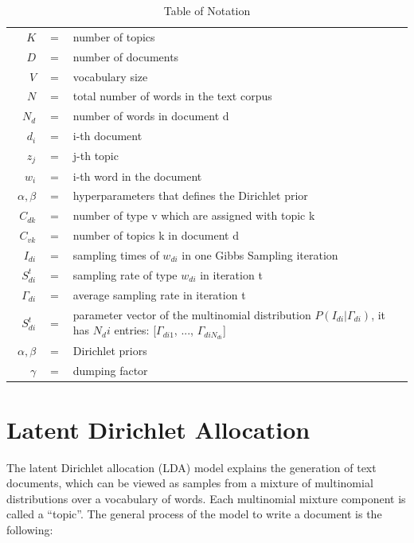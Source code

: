 \documentclass{article} %
\begin{document}
\begin{table}[htbp]\caption{Table of Notation}
\centering %
\begin{tabular}{r c p{10cm} }
\toprule

$K$ & $=$ & number of topics\\
$D$ & $=$ & number of documents\\
$V$ & $=$ & vocabulary size\\
$N$ & $=$ &  total number of words in the text corpus\\
$N_d$ & $=$ &  number of words in document d\\
$d_i$ & $=$ & i-th document\\
$z_j$ & $=$ & j-th topic\\
$w_i$ & $=$ & i-th word in the document\\
$\alpha, \beta$ & $=$ & hyperparameters that defines the Dirichlet prior\\
$C_{dk}$ & $=$ & number of type v which are assigned with topic k\\
$C_{vk}$ & $=$ & number of topics k in document d\\
$I_{di}$ & $=$ & sampling times of $w_{di}$ in one Gibbs Sampling iteration\\
$S_{di}^{t}$ & $=$ & sampling rate of type $w_{di}$ in iteration t\\
$\Gamma_{di}$ & $=$ & average sampling rate in iteration t\\
$S_{di}^{t}$ & $=$ & parameter vector of the multinomial distribution $P(I_{di}|\Gamma_{di})$, it has $N_di$ entries: [$\Gamma_{di1}$, ..., $\Gamma_{diN_{di}}$]\\\
$\alpha,\beta$ & $=$ & Dirichlet priors\\
$\gamma $ & $=$ &dumping factor\\


\bottomrule
\end{tabular}
\label{tab:TableOfNotationForMyResearch}
\end{table}



\section{Latent Dirichlet Allocation}
The latent Dirichlet allocation (LDA) model explains the generation of text documents, which can be viewed as samples from a mixture of multinomial distributions over a vocabulary of words. Each multinomial mixture component is called a ``topic''. The general process of the model to write a document is the following:
\end{document}
